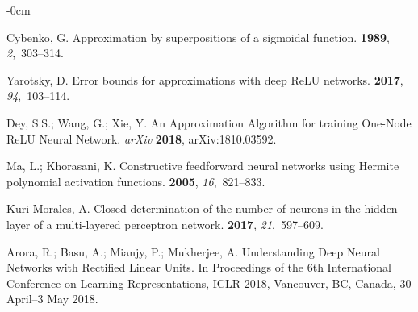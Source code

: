 \documentclass[appliedmath,article,accept,pdftex,moreauthors]{Definitions/mdpi}
\begin{document}
\begin{adjustwidth}{-\extralength}{0cm}



%
\begin{thebibliography}{999}

Cybenko, G.
\newblock Approximation by superpositions of a sigmoidal function.
 {\bf 1989}, {\em
  2},~303--314.

Yarotsky, D.
\newblock Error bounds for approximations with deep ReLU networks.
 {\bf 2017}, {\em 94},~103--114.

Dey, S.S.; Wang, G.; Xie, Y.
\newblock An Approximation Algorithm for training One-Node ReLU Neural Network.  \emph{arXiv} \textbf{2018},	arXiv:1810.03592.%



Ma, L.; Khorasani, K.
\newblock Constructive feedforward neural networks using Hermite polynomial
  activation functions.
 {\bf 2005}, {\em
  16},~821--833.

Kuri-Morales, A.
\newblock Closed determination of the number of neurons in the hidden layer of
  a multi-layered perceptron network.
 {\bf 2017}, {\em 21},~597--609.

Arora, R.; Basu, A.; Mianjy, P.; Mukherjee, A.
\newblock Understanding Deep Neural Networks with Rectified Linear Units.
\newblock In Proceedings of the 6th International Conference on Learning
  Representations, {ICLR} 2018, Vancouver, BC, Canada, 30 April--3 May 2018. %


\end{thebibliography}
\end{adjustwidth}
\end{document}
